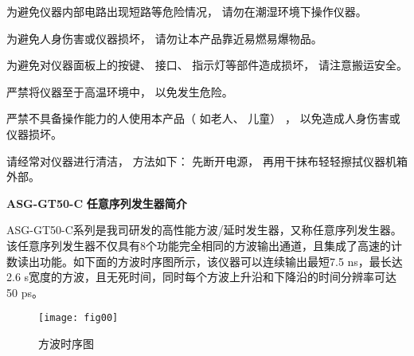 \vspace{0.6cm}

为避免仪器内部电路出现短路等危险情况， 请勿在潮湿环境下操作仪器。


\vspace{0.6cm}

为避免人身伤害或仪器损坏， 请勿让本产品靠近易燃易爆物品。

\vspace{0.6cm}

为避免对仪器面板上的按键、 接口、 指示灯等部件造成损坏， 请注意搬运安全。

\newpage

严禁将仪器至于高温环境中， 以免发生危险。

\vspace{0.5cm}

严禁不具备操作能力的人使用本产品（ 如老人、 儿童） ， 以免造成人身伤害或仪器损坏。

\vspace{0.5cm}

请经常对仪器进行清洁， 方法如下： 先断开电源， 再用干抹布轻轻擦拭仪器机箱外部。

\newpage
\noindent\huge \textbf{ASG-GT50-C} \xiaoer\textbf{任意序列发生器简介}
\vspace{0.6cm}

 \normalsize ASG-GT50-C\song 系列是我司研发的高性能方波/延时发生器，又称任意序列发生器。该任意序列发生器不仅具有8个功能完全相同的方波输出通道，且集成了高速的计数读出功能。如下面的方波时序图所示，该仪器可以连续输出最短7.5 ns，最长达2.6 s宽度的方波，且无死时间，同时每个方波上升沿和下降沿的时间分辨率可达50 ps。
\begin{figure}[ht]
\centering
\texttt{[image: fig00]}
\caption{方波时序图}\label{fig:fig1}
\end{figure}
\vspace{0.7cm}

